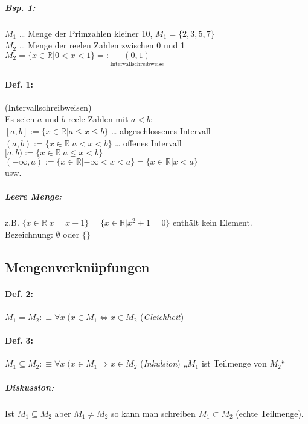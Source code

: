 \subparagraph{Bsp. 1:} \parskp
$M_1$ … Menge der Primzahlen kleiner 10, $M_1=\{2,3,5,7\}$\\
$M_2$ … Menge der reelen Zahlen zwischen 0 und 1 $M_2=\{x \in \mathbb{R}| 0<x<1\} =: \underset{\text{Intervallschreibweise}}{(0,1)}$

\paragraph{Def. 1:} (Intervallschreibweisen) \\
Es seien $a$ und $b$ reele Zahlen mit $a<b$:\\
$[a,b]:=\{ x \in \mathbb{R} | a \le x \le b\}$ … abgeschlossenes Intervall\\
$(a,b):= \{ x \in \mathbb{R} | a < x < b\}$ … offenes Intervall\\
$[a,b):= \{ x \in \mathbb{R}  | a \le x < b\}$\\
$(-\infty , a ) := \{ x \in \mathbb{R} | - \infty < x < a \} = \{x \in \mathbb{R} | x < a\}$\\
usw.

\subparagraph{Leere Menge:} z.B. $\{ x \in \mathbb{R} | x =x+1\}= \{x \in \mathbb{R} | x^2+1=0\}$ enthält kein Element.\\
Bezeichnung: $\emptyset$ oder $\{\}$

\subsection{Mengenverknüpfungen}

\paragraph{Def. 2:} \parskp
$\boxed{M_1 = M_2} : \equiv \boxed{\forall x \; (x\in M_1 \Leftrightarrow x \in M_2}$ (\emph{Gleichheit})
\paragraph{Def. 3:} \parskp
$\boxed{M_1 \subseteq M_2} : \equiv \boxed{\forall x \; (x\in M_1 \Rightarrow x \in M_2}$ (\emph{Inkulsion}) „$M_1$ ist Teilmenge von $M_2$“

\subparagraph{Diskussion:} \parskp
Ist $M_1 \subseteq M_2$ aber $M_1\not = M_2$ so kann man schreiben $M_1\subset M_2$ (echte Teilmenge).


